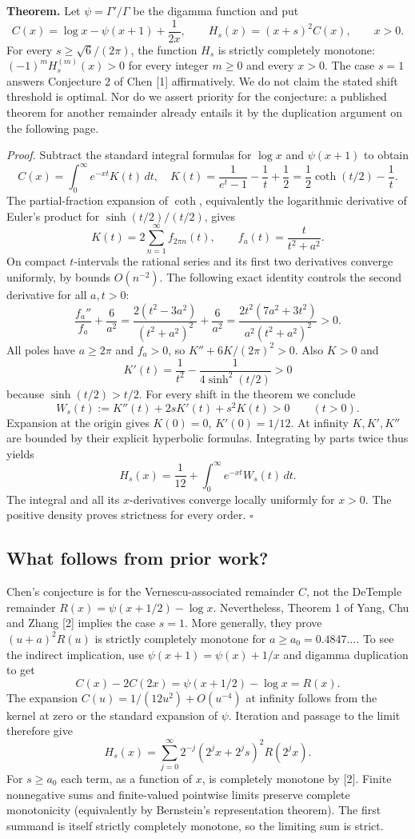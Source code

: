 \documentclass[11pt,a4paper]{article}
\numberwithin{equation}{section}
\theoremstyle{definition}
\theoremstyle{remark}
\begin{document}
\textbf{Theorem.} Let \(\psi=\Gamma'/\Gamma\) be the digamma function and put
\[
 C(x)=\log x-\psi(x+1)+\frac{1}{2x},\qquad H_s(x)=(x+s)^2C(x),\qquad x>0.
\]
For every \(s\ge\sqrt{6}/(2\pi)\), the function \(H_s\) is strictly completely
monotone: \((-1)^mH_s^{(m)}(x)>0\) for every integer \(m\ge0\) and every
\(x>0\). The case \(s=1\) answers Conjecture 2 of Chen [1] affirmatively.
We do not claim the stated shift threshold is optimal. Nor do we assert
priority for the conjecture: a published theorem for another remainder
already entails it by the duplication argument on the following page.

\textit{Proof.} Subtract the standard integral formulas for \(\log x\)
and \(\psi(x+1)\) to obtain
\[
 C(x)=\int_0^\infty e^{-xt}K(t)\,dt,\quad
 K(t)=\frac{1}{e^t-1}-\frac1t+\frac12
     =\frac12\coth(t/2)-\frac1t .
\]
The partial-fraction expansion of \(\coth\), equivalently the logarithmic
derivative of Euler's product for \(\sinh(t/2)/(t/2)\), gives
\[
 K(t)=2\sum_{n=1}^{\infty} f_{2\pi n}(t),\qquad f_a(t)=\frac{t}{t^2+a^2}.
\]
On compact \(t\)-intervals the rational series and its first two derivatives
converge uniformly, by bounds \(O(n^{-2})\). The following exact identity
controls the second derivative for all \(a,t>0\):
\[
 \frac{f_a''}{f_a}+\frac{6}{a^2}
 =\frac{2(t^2-3a^2)}{(t^2+a^2)^2}+\frac6{a^2}
 =\frac{2t^2(7a^2+3t^2)}{a^2(t^2+a^2)^2}>0.
\]
All poles have \(a\ge2\pi\) and \(f_a>0\), so
\(K''+6K/(2\pi)^2>0\). Also \(K>0\) and
\[
 K'(t)=\frac{1}{t^2}-\frac{1}{4\sinh^2(t/2)}>0
\]
because \(\sinh(t/2)>t/2\). For every shift in the theorem we conclude
\[
 W_s(t):=K''(t)+2sK'(t)+s^2K(t)>0\qquad (t>0).
\]
Expansion at the origin gives \(K(0)=0\), \(K'(0)=1/12\).
At infinity \(K,K',K''\) are bounded by their explicit hyperbolic formulas.
Integrating by parts twice thus yields
\[
 H_s(x)=\frac1{12}+\int_0^\infty e^{-xt}W_s(t)\,dt .
\]
The integral and all its \(x\)-derivatives converge locally uniformly for
\(x>0\). The positive density proves strictness for every order. \hfill\(\square\)


\subsection*{What follows from prior work?}
Chen's conjecture is for the Vernescu-associated remainder \(C\), not the
DeTemple remainder \(R(x)=\psi(x+1/2)-\log x\). Nevertheless, Theorem 1
of Yang, Chu and Zhang [2] implies the case \(s=1\). More generally, they
prove \((u+a)^2R(u)\) is strictly completely monotone for
\(a\ge a_0=0.4847\ldots\). To see the indirect implication,
use \(\psi(x+1)=\psi(x)+1/x\) and digamma duplication to get
\[
 C(x)-2C(2x)=\psi(x+1/2)-\log x=R(x).
\]
The expansion \(C(u)=1/(12u^2)+O(u^{-4})\) at infinity follows from
the kernel at zero or the standard expansion of \(\psi\).
Iteration and passage to the limit therefore give
\[
 H_s(x)=\sum_{j=0}^\infty 2^{-j}
     (2^j x+2^j s)^2 R(2^j x).
\]
For \(s\ge a_0\) each term, as a function of \(x\), is completely
monotone by [2]. Finite nonnegative sums and finite-valued pointwise
limits preserve complete monotonicity (equivalently by Bernstein's
representation theorem). The first summand is itself strictly completely
monotone, so the limiting sum is strict.
\end{document}
